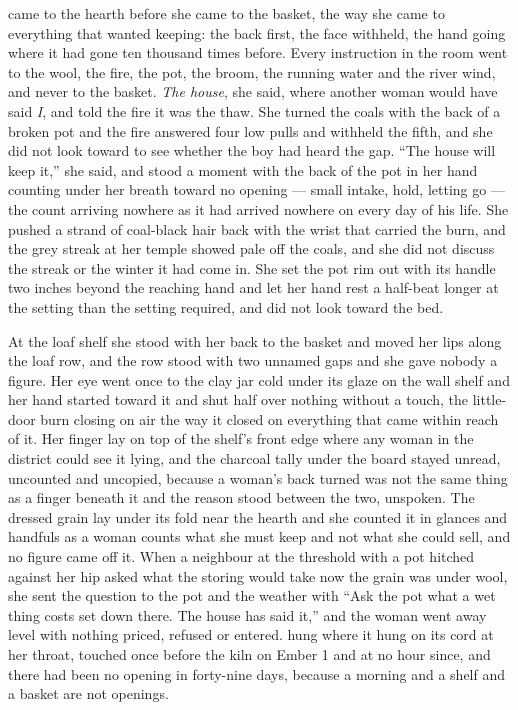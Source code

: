 \scenebreak

 came to the hearth before she came to the basket, the way she came to everything that wanted keeping: the back first, the face withheld, the hand going where it had gone ten thousand times before. Every instruction in the room went to the wool, the fire, the pot, the broom, the running water and the river wind, and never to the basket. \emph{The house}, she said, where another woman would have said \emph{I}, and told the fire it was the thaw. She turned the coals with the back of a broken pot and the fire answered four low pulls and withheld the fifth, and she did not look toward  to see whether the boy had heard the gap. “The house will keep it,” she said, and stood a moment with the back of the pot in her hand counting under her breath toward no opening --- small intake, hold, letting go --- the count arriving nowhere as it had arrived nowhere on every day of his life. She pushed a strand of coal-black hair back with the wrist that carried the burn, and the grey streak at her temple showed pale off the coals, and she did not discuss the streak or the winter it had come in. She set the pot rim out with its handle two inches beyond the reaching hand and let her hand rest a half-beat longer at the setting than the setting required, and did not look toward the bed.

At the loaf shelf she stood with her back to the basket and moved her lips along the loaf row, and the row stood with two unnamed gaps and she gave nobody a figure. Her eye went once to the clay jar cold under its glaze on the wall shelf and her hand started toward it and shut half over nothing without a touch, the little-door burn closing on air the way it closed on everything that came within reach of it. Her finger lay on top of the shelf's front edge where any woman in the district could see it lying, and the charcoal tally under the board stayed unread, uncounted and uncopied, because a woman's back turned was not the same thing as a finger beneath it and the reason stood between the two, unspoken. The dressed grain lay under its fold near the hearth and she counted it in glances and handfuls as a woman counts what she must keep and not what she could sell, and no figure came off it. When a neighbour at the threshold with a pot hitched against her hip asked what the storing would take now the grain was under wool, she sent the question to the pot and the weather with “Ask the pot what a wet thing costs set down there. The house has said it,” and the woman went away level with nothing priced, refused or entered.  hung where it hung on its cord at her throat, touched once before the kiln on Ember 1 and at no hour since, and there had been no opening in forty-nine days, because a morning and a shelf and a basket are not openings.

